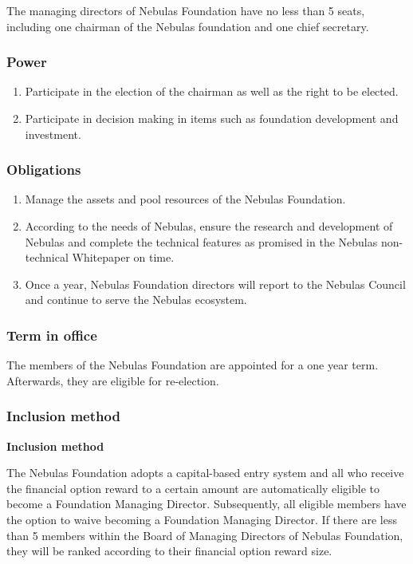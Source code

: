 The managing directors of Nebulas Foundation have no less than 5 seats, including one chairman of the Nebulas foundation and one chief secretary.

\subsubsection{Power}

\begin{enumerate}
	\item Participate in the election of the chairman as well as the right to be elected.
	\item Participate in decision making in items such as foundation development and investment.
\end{enumerate}

\subsubsection{Obligations}

\begin{enumerate}
	\item Manage the assets and pool resources of the Nebulas Foundation.
	\item According to the needs of Nebulas, ensure the research and development of Nebulas and complete the technical features as promised in the Nebulas non-technical Whitepaper on time.
	\item Once a year, Nebulas Foundation directors will report to the Nebulas Council and continue to serve the Nebulas ecosystem.
\end{enumerate}

\subsubsection{Term in office}

The members of the Nebulas Foundation are appointed for a one year term. Afterwards, they are eligible for re-election.

\subsubsection{Inclusion method}

\textbf{Inclusion method}

The Nebulas Foundation adopts a capital-based entry system and all who receive the financial option reward to a certain amount are automatically eligible to become a Foundation Managing Director. Subsequently, all eligible members have the option to waive becoming a Foundation Managing Director. If there are less than 5 members within the Board of Managing Directors of Nebulas Foundation, they will be ranked according to their financial option reward size.

